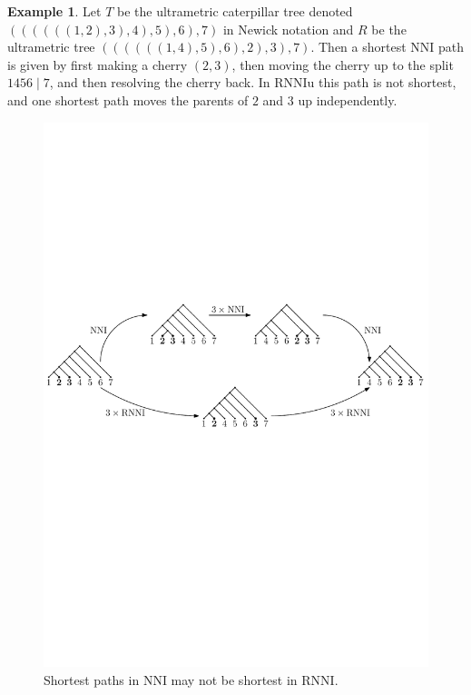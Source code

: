 \documentclass[11pt]{amsart}
\theoremstyle{definition}
\newtheorem{example}[lemma]{Example}
\newcommand{\nni}{\mathrm{NNI}}
\newcommand{\rnni}{\mathrm{RNNI}}
\newcommand{\rnniu}{\mathrm{RNNIu}}
\providecommand{\DIFaddbegin}{} %
\providecommand{\DIFaddend}{} %
\begin{document}
\begin{example}
\DIFaddbegin \label{ex_caterpillars}
\DIFaddend Let $T$ be the ultrametric caterpillar tree denoted $((((((1, 2), 3), 4), 5), 6), 7)$ in Newick notation \autocite{felsenstein1990newick} and $R$ be the ultrametric tree $((((((1, 4), 5), 6), 2), 3), 7)$.
Then a shortest $\nni$ path is given by first making a cherry $(2,3)$, then moving the cherry up to the split $1456 \mid 7$, and then resolving the cherry back.
In $\rnniu$ this path is not shortest, and one shortest path moves the parents of $2$ and $3$ up independently.

\begin{figure}[ht]
\centering
\includegraphics[width=\textwidth]{NNI_VS_rNNI.pdf}
\caption{Shortest paths in $\nni$ may not be shortest in $\rnni$.}
\label{NNI_VS_rNNI.pdf}
\end{figure}
\end{example}
\end{document}
